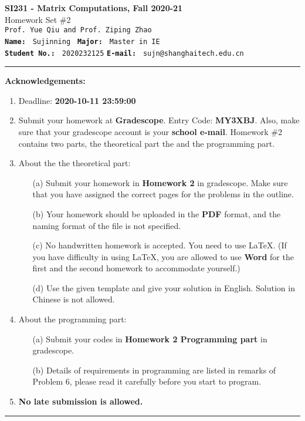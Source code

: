 \documentclass[english,onecolumn]{IEEEtran}
\begin{document}
\begin{center}
	\textbf{{\Large SI231 - Matrix Computations, Fall 2020-21}}\\
	Homework Set \#2\\
   \texttt{Prof. Yue Qiu and Prof. Ziping Zhao} \\
	\texttt{\textbf{Name:}}   	\texttt{ Sujinning }  		\hspace{1bp}
	\texttt{\textbf{Major:}}  	\texttt{ Master in IE } 	\\
	\texttt{\textbf{Student No.:}} 	\texttt{ 2020232125}     \hspace{1bp}
	\texttt{\textbf{E-mail:}} 	\texttt{ sujn@shanghaitech.edu.cn}
\par\end{center}


\noindent
\rule{\linewidth}{0.4pt}
{\bf {\large Acknowledgements:}}
\begin{enumerate}
    \item Deadline: \textbf{2020-10-11 23:59:00}
    \item Submit your homework at \textbf{Gradescope}. Entry Code: \textbf{MY3XBJ}. Also, make sure that your gradescope account is your \textbf{school e-mail}.
    Homework \#2 contains two parts, the theoretical part the and the programming part.
    \item About the the theoretical part:
    \begin{enumerate}
            \item[(a)] Submit your homework in \textbf{Homework 2} in gradescope. Make sure that you have assigned the correct pages for the problems in the outline.
            \item[(b)] Your homework should be uploaded in the \textbf{PDF} format, and the naming format of the file is not specified.
            \item[(c)] No handwritten homework is accepted. You need to use \LaTeX. (If you have difficulty in using \LaTeX, you are allowed to use \textbf{Word} for the first and the second homework to accommodate yourself.)
            \item[(d)] Use the given template and give your solution in English. Solution in Chinese is not allowed. 
        \end{enumerate}
  \item About the programming part:
  \begin{enumerate}
      \item[(a)] Submit your codes in \textbf{Homework 2 Programming part} in gradescope.
      \item[(b)] Details of requirements in programming are listed in remarks of Problem 6, please read it carefully before you start to program.
  \end{enumerate}
  \item \textbf{No late submission is allowed.}
\end{enumerate}
\rule{\linewidth}{0.4pt}
\end{document}
